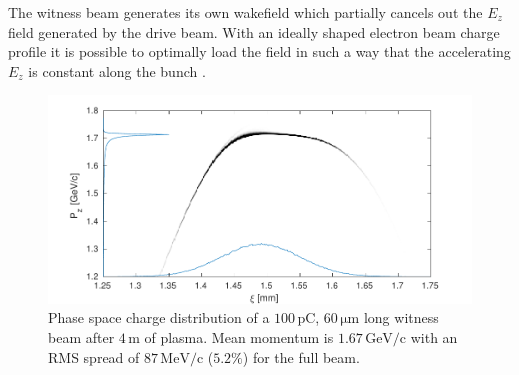 \documentclass[aps,prstab,reprint,amsmath,amssymb,groupedaddress]{revtex4-1}
\newcommand{\unit}[1]{\,\mathrm{#1}}
\begin{document}

The witness beam generates its own wakefield which partially cancels out the $E_{z}$ field generated by the drive beam.
With an ideally shaped electron beam charge profile it is possible to optimally load the field in such a way that the
accelerating $E_{z}$ is constant along the bunch \cite{katsouleas:1987, tzoufras:2009}.


\begin{figure}[hbt]
    \includegraphics[width=\linewidth,trim={2mm 0mm 2mm 0mm},clip]{figures/beamPhaseSpace}
    \caption{\label{Fig:BeamPS} Phase space charge distribution of a $100\unit{pC}$, $60\unit{\mu m}$ long witness beam
        after $4\unit{m}$ of plasma. Mean momentum is $1.67\unit{GeV/c}$ with an RMS spread of $87\unit{MeV/c}$
        ($5.2\%$) for the full beam.}
\end{figure}
\end{document}
